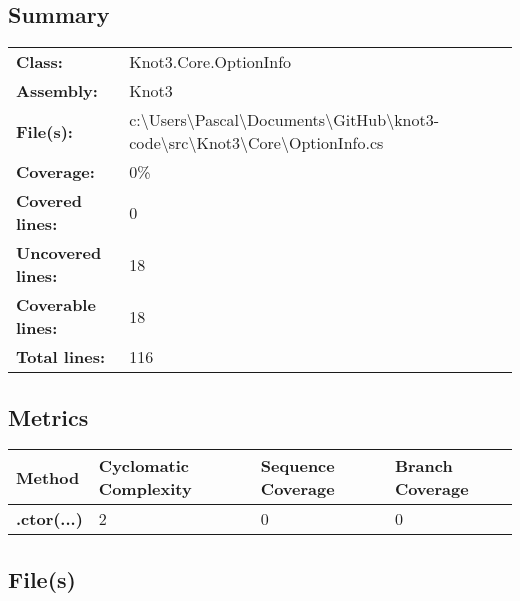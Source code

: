 \documentclass[a4paper,10pt]{article}
\begin{document}
\subsection{Summary}
\begin{longtable}[l]{ll}
\textbf{Class:} & Knot3.Core.OptionInfo\\
\textbf{Assembly:} & Knot3\\
\textbf{File(s):} & \begin{minipage}[t]{12cm}{c:\textbackslash Users\textbackslash Pascal\textbackslash Documents\textbackslash GitHub\textbackslash knot3-code\textbackslash src\textbackslash Knot3\textbackslash Core\textbackslash OptionInfo.cs}\end{minipage} \\
\textbf{Coverage:} & 0\%\\
\textbf{Covered lines:} & 0\\
\textbf{Uncovered lines:} & 18\\
\textbf{Coverable lines:} & 18\\
\textbf{Total lines:} & 116\\
\end{longtable}
\subsection{Metrics}
\begin{longtable}[l]{|l|l|l|l|}
\hline
\textbf{Method} & \textbf{Cyclomatic Complexity} & \textbf{Sequence Coverage} & \textbf{Branch Coverage}\\
\hline
\textbf{.ctor(...)} & 2 & 0 & 0\\
\hline
\end{longtable}
\subsection{File(s)}
\end{document}
